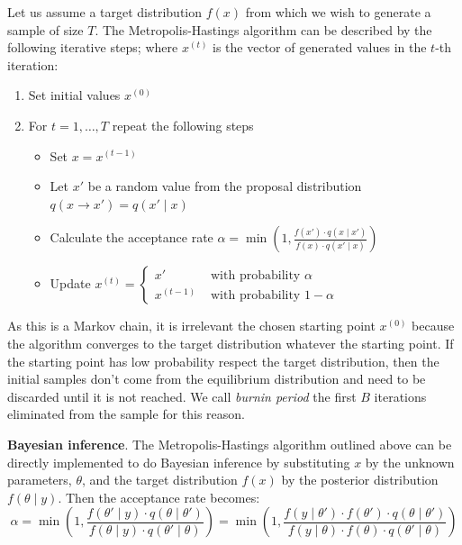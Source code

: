 \documentclass[11pt,fleqn]{book} %
\begin{document}
\begin{algorithm}
	Let us assume a target distribution $f(x)$ from which we wish to 
	generate a sample of size $T$. The Metropolis-Hastings algorithm can 
	be described by the following iterative steps; where $x^{(t)}$ is the 
	vector of generated values in the $t$-th iteration:
	\begin{enumerate}
		\item Set initial values $x^{(0)}$
		\item For $t=1,\dots,T$ repeat the following steps
		\begin{itemize}
			\item Set $x=x^{(t-1)}$
			\item Let $x'$ be a random value from the proposal distribution 
			$q(x \to x')=q(x' \mid x)$
			\item Calculate the acceptance rate 
			$\alpha = \min\left(1,\frac{f(x') \cdot q(x \mid x')}{f(x) \cdot q(x' \mid x)}\right)$
			\item Update $x^{(t)}=\left\{
			\begin{array}{ll}
				x'        & \text{ with probability } \alpha   \\
				x^{(t-1)} & \text{ with probability } 1-\alpha 
			\end{array}\right.$ 
		\end{itemize}
	\end{enumerate}
\end{algorithm}

As this is a Markov chain, it is irrelevant the chosen starting point 
$x^{(0)}$ because the algorithm converges to the target distribution
whatever the starting point. If the starting point has low probability 
respect the target distribution, then the initial samples don't come 
from the equilibrium distribution and need to be discarded until it is 
not reached. We call \emph{burnin period} the first $B$ iterations 
eliminated from the sample for this reason.

\textbf{Bayesian inference}.
The Metropolis-Hastings algorithm outlined above can be directly implemented to do
Bayesian inference by substituting $x$ by the unknown parameters, $\theta$, and 
the target distribution $f(x)$ by the posterior distribution $f(\theta \mid y)$. Then 
the acceptance rate becomes:
\begin{displaymath}
	\alpha = \min\left(1,\frac{f(\theta' \mid y) \cdot q(\theta \mid \theta')}{f(\theta \mid y) \cdot q(\theta' \mid \theta)}\right) = \min\left(1,\frac{f(y \mid \theta') \cdot f(\theta') \cdot q(\theta \mid \theta')}{f(y \mid \theta)  \cdot f(\theta) \cdot q(\theta' \mid \theta)}\right)
\end{displaymath}
\end{document}
